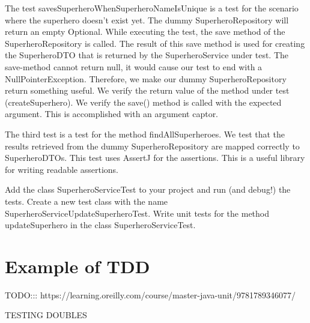 The test savesSuperheroWhenSuperheroNameIsUnique is a test for the scenario where the superhero doesn't exist yet.
The dummy SuperheroRepository will return an empty Optional.  While executing the test, the save method of the SuperheroRepository is called.  The result of this save method is used for creating the SuperheroDTO that is returned by the SuperheroService under test.
The save-method cannot return null, it would cause our test to end with a NullPointerException. Therefore, we make our dummy SuperheroRepository return something useful. We verify the return value of the method under test (createSuperhero). We verify the save() method is called with the expected argument.  This is accomplished with an argument captor. 

The third test is a test for the method findAllSuperheroes.  We test that the results retrieved from the dummy SuperheroRepository are mapped correctly to SuperheroDTOs.  This test uses AssertJ for the assertions. This is a useful library for writing readable assertions. 
 
\begin{oefening}
Add the class SuperheroServiceTest to your project and run (and debug!) the tests. 
Create a new test class with the name SuperheroServiceUpdateSuperheroTest.
Write unit tests for the method updateSuperhero in the class SuperheroServiceTest. 
\end{oefening}
 
 
 
 
 \section{Example of TDD}
 
 TODO::: https://learning.oreilly.com/course/master-java-unit/9781789346077/
 
 TESTING DOUBLES
 
